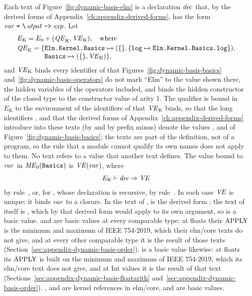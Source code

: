 Each text of Figure~\ref{fig:dynamic-basis-elm} is a declaration $\mathit{dec}$ that,
by the derived forms of Appendix~\ref{ch:appendix-derived-forms}, has the
form $\var\ \kw{=}\ \kw{\textbackslash}\,\atpat\ \kw{->}\ \expm$. Let
\[
  \begin{array}{@{}l@{}}
  E_{\mathrm{K}}=E_0+(\QE_{\mathrm{K}},\VE_{\mathrm{K}}),\quad\text{where}\\[0.5ex]
  \QE_{\mathrm{K}}=\{\kw{Elm.Kernel.Basics}\mapsto(\emptymap,\{\kw{log}\mapsto\kw{Elm.Kernel.Basics.log}\}),\\
  \phantom{\QE_{\mathrm{K}}=\{}\kw{Basics}\mapsto(\emptymap,\VE_{\mathrm{K}})\},
  \end{array}
\]
and $\mathit{VE}_{\mathrm{K}}$ binds every identifier of  that
Figures~\ref{fig:dynamic-basis-basics} and~\ref{fig:dynamic-basis-operators}
do not mark ``Elm'' to the value shown there, the hidden variables of the
operators included, and binds the hidden constructor  of the
closed type  to the constructor value  of arity
$1$. The qualifier  is bound in $E_{\mathrm{K}}$ to the
environment of the identifiers of  that $\mathit{VE}_{\mathrm{K}}$ binds,
so that the long identifiers ,  and
 that the derived forms of
Appendix~\ref{ch:appendix-derived-forms} introduce into these texts (by
 and by prefix minus) denote the values ,  and
 of Figure~\ref{fig:dynamic-basis-basics}; the texts are part of
the definition, not of a program, so the rule that a module cannot qualify
its own names does not apply to them. %
No text refers
to a value that another text defines. The value bound to $\mathit{var}$ in
$\mathit{ME}_0(\textnormal{\texttt{Basics}})$ is $\mathit{VE}(\mathit{var})$, where
\[
  E_{\mathrm{K}} \vdash \mathit{dec} \Rightarrow \mathit{VE}
\]
by rule~, or, for , whose declaration is
recursive, by rule~. In each case $\mathit{VE}$ is unique: it
binds $\mathit{var}$ to a closure. %
In the text of ,  is the derived form ;
the text of  itself is , which by that derived form would
apply  to its own argument, so  is a basic value.
 and  are basic values at every comparable type: at floats
their $\mathrm{APPLY}$ is the minimum and maximum of IEEE 754-2019, which their
elm/core texts do not give, and at every other comparable type it is the
result of those texts (Section~\ref{sec:appendix-dynamic-basis-order}). %
 is a basic value likewise: at floats its $\mathrm{APPLY}$ is built on the
minimum and maximum of IEEE 754-2019, which its elm/core text does not
give, and at Int values it is the result of that text
(Sections~\ref{sec:appendix-dynamic-basis-floatarith}
and~\ref{sec:appendix-dynamic-basis-order}). %
,  and  are kernel
references in elm/core, and are basic values.

